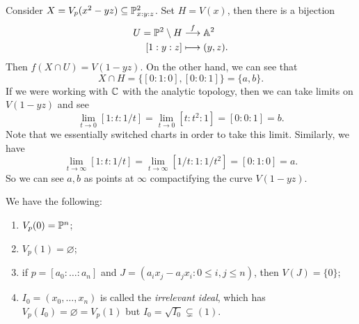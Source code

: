\begin{example}
  Consider $X = V_p(x^2 - yz) \subseteq \mathbb{P}^{2}_{x : y : z}$.
  Set $H = V(x)$, then there is a bijection
  \begin{align*}
    U = \mathbb{P}^2 \setminus H
    &\overset{f}{\longrightarrow} \mathbb{A}^2 \\
    [1 : y : z]
    &\longmapsto (y, z).
  \end{align*}
  Then $f(X \cap U) = V(1 - yz)$. On the
  other hand, we can see that
  \[
    X \cap H
    = \{[0 : 1 : 0], [0 : 0 : 1]\}
    = \{a, b\}.
  \]
  If we were working with $\mathbb{C}$ with
  the analytic topology, then we can
  take limits on $V(1 - yz)$ and see
  \[
    \lim_{t \to 0} [1 : t : 1 / t]
    = \lim_{t \to 0} [t : t^2 : 1]
    = [0 : 0 : 1] = b.
  \]
  Note that we essentially switched
  charts in order to take this limit.
  Similarly, we have
  \[
    \lim_{t \to \infty}
    [1 : t : 1 / t]
    = \lim_{t \to \infty} [1 / t : 1 : 1 / t^2]
    = [0 : 1 : 0] = a.
  \]
  So we can see $a, b$ as points at
  $\infty$ compactifying the curve
  $V(1 - yz)$.
\end{example}

\begin{example}
  We have the following:
  \begin{enumerate}
    \item $V_p(0) = \mathbb{P}^n$;
    \item $V_p(1) = \varnothing$;
    \item if $p = [a_0 : \dots : a_n]$
      and
      $J = (a_i x_j - a_j x_i : 0 \le i, j \le n)$,
      then $V(J) = \{0\}$;
    \item $I_0 = (x_0, \dots, x_n)$
      is called the \emph{irrelevant ideal},
      which has
      $V_p(I_0) = \varnothing = V_p(1)$
      but $I_0 = \sqrt{I_0} \subsetneq (1)$.
  \end{enumerate}
\end{example}
